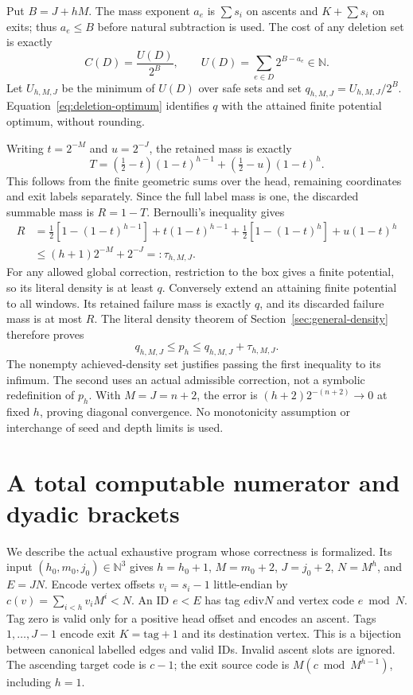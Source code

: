 \documentclass[11pt,letterpaper]{article}
\newcommand{\NN}{\mathbb{N}}
\begin{document}
Put $B=J+hM$. The mass exponent $a_e$ is $\sum s_i$ on ascents and
$K+\sum s_i$ on exits; thus $a_e\le B$ before natural subtraction is used.
The cost of any deletion set is exactly
\[
 C(D)=\frac{U(D)}{2^B},\qquad U(D)=\sum_{e\in D}2^{B-a_e}\in\NN.
\]
Let $U_{h,M,J}$ be the minimum of $U(D)$ over safe sets and set
$q_{h,M,J}=U_{h,M,J}/2^B$. Equation~\eqref{eq:deletion-optimum} identifies
$q$ with the attained finite potential optimum, without rounding.

Writing $t=2^{-M}$ and $u=2^{-J}$, the retained mass is exactly
\[
 T=(\tfrac12-t)(1-t)^{h-1}+(\tfrac12-u)(1-t)^h.
\]
This follows from the finite geometric sums over the head, remaining
coordinates and exit labels separately. Since the full label mass is one,
the discarded summable mass is $R=1-T$. Bernoulli's inequality gives
\begin{align*}
 R&=\tfrac12[1-(1-t)^{h-1}]+t(1-t)^{h-1}
      +\tfrac12[1-(1-t)^h]+u(1-t)^h\\
  &\le(h+1)2^{-M}+2^{-J}=:\tau_{h,M,J}.
\end{align*}
For any allowed global correction, restriction to the box gives a finite
potential, so its literal density is at least $q$. Conversely extend an
attaining finite potential to all windows. Its retained failure mass is
exactly $q$, and its discarded failure mass is at most $R$. The literal
density theorem of Section~\ref{sec:general-density} therefore proves
\begin{equation}\label{eq:optimization-sandwich}
 q_{h,M,J}\le p_h\le q_{h,M,J}+\tau_{h,M,J}.
\end{equation}
The nonempty achieved-density set justifies passing the first inequality to
its infimum. The second uses an actual admissible correction, not a symbolic
redefinition of $p_h$. With $M=J=n+2$, the error is
$(h+2)2^{-(n+2)}\to0$ at fixed $h$, proving diagonal convergence. No
monotonicity assumption or interchange of seed and depth limits is used.

\section{A total computable numerator and dyadic brackets}
We describe the actual exhaustive program whose correctness is formalized.
Its input $(h_0,m_0,j_0)\in\NN^3$ gives
$h=h_0+1$, $M=m_0+2$, $J=j_0+2$, $N=M^h$, and $E=JN$.
Encode vertex offsets $v_i=s_i-1$ little-endian by
$c(v)=\sum_{i<h}v_iM^i<N$. An ID $e<E$ has tag $e\mathbin{\mathrm{div}}N$
and vertex code $e\bmod N$. Tag zero is valid only for a positive head
offset and encodes an ascent. Tags $1,\ldots,J-1$ encode exit
$K=\mathrm{tag}+1$ and its destination vertex. This is a bijection between
canonical labelled edges and valid IDs. Invalid ascent slots are ignored.
The ascending target code is $c-1$; the exit source code is
$M(c\bmod M^{h-1})$, including $h=1$.
\end{document}
